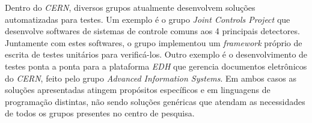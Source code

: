 Dentro do \emph{CERN}, diversos grupos atualmente desenvolvem soluções automatizadas para testes. Um exemplo é o grupo \emph{Joint Controls Project} que desenvolve softwares de sistemas de controle comuns aos 4 principais detectores. 
Juntamente com estes softwares, o grupo implementou um \emph{framework} próprio de escrita de testes unitários para verificá-los. Outro exemplo é o desenvolvimento de testes ponta a ponta para a plataforma \emph{EDH} que gerencia documentos eletrônicos do \emph{CERN}, feito pelo grupo \emph{Advanced Information Systems}. Em ambos casos as soluções apresentadas atingem propósitos específicos e em linguagens de programação distintas, não sendo soluções genéricas que atendam as necessidades de todos os grupos presentes no centro de pesquisa.